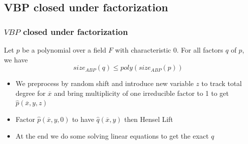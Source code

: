 \documentclass[10pt]{beamer}
\begin{document}

\subsection{VBP closed under factorization}
\begin{frame}
	\frametitle{$VBP$ closed under factorization}
	
	\begin{theorem}
		Let $p$ be a polynomial over a field $F$ with characteristic 0. For all factors $q$ of $p$, we have $$size_{ABP} (q) \leq poly(size_{ABP} (p))$$
	\end{theorem}
	\vspace{5mm}
 
	\begin{itemize}
	    \item We preprocess by random shift and introduce new variable $z$ to track total degree for $\overline{x}$ and bring multiplicity of one irreducible factor to 1 to get $\hat{p}(\overline{x},y,z)$
     \item Factor $\hat{p}(\overline{x},y,0)$ to have $\hat{q}(\overline{x},y)$ then Hensel Lift
     \item At the end we do some solving linear equations to get the exact $q$
	\end{itemize}
\end{frame}

\end{document}
